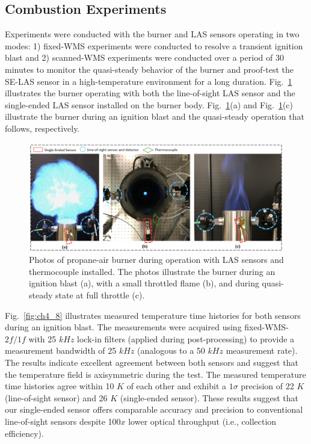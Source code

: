 \subsection{Combustion Experiments}
Experiments were conducted with the burner and LAS sensors operating in two modes: 1) fixed-WMS experiments were conducted to resolve a transient ignition blast and 2) scanned-WMS experiments were conducted over a period of 30 minutes to monitor the quasi-steady behavior of the burner and proof-test the SE-LAS sensor in a high-temperature environment for a long duration. Fig.\ \ref{fig:ch4_7} illustrates the burner operating with both the line-of-sight LAS sensor and the single-ended LAS sensor installed on the burner body. Fig.\ \ref{fig:ch4_7}(a) and Fig.\ \ref{fig:ch4_7}(c) illustrate the burner during an ignition blast and the quasi-steady operation that follows, respectively.

 \begin{figure}[t]
    \centering
        \includegraphics[width=1\textwidth]{fig/ch4_fig6_v3.png}
        \caption{Photos of propane-air burner during operation with LAS sensors and thermocouple installed. The photos illustrate the burner during an ignition blast (a), with a small throttled flame (b), and during quasi-steady state at full throttle (c).}
    \label{fig:ch4_7}
\end{figure}

Fig.\ \ref{fig:ch4_8} illustrates measured temperature time histories for both sensors during an ignition blast. The measurements were acquired using fixed-WMS-$2f/1f$ with 25 $kHz$ lock-in filters (applied during post-processing) to provide a measurement bandwidth of 25 $kHz$ (analogous to a 50 $kHz$ measurement rate). The results indicate excellent agreement between both sensors and suggest that the temperature field is axisymmetric during the test. The measured temperature time histories agree within 10 $K$ of each other and exhibit a $1\sigma$ precision of 22 $K$ (line-of-sight sensor) and 26 $K$ (single-ended sensor). These results suggest that our single-ended sensor offers comparable accuracy and precision to conventional line-of-sight sensors despite 100$x$ lower optical throughput (i.e., collection efficiency).

